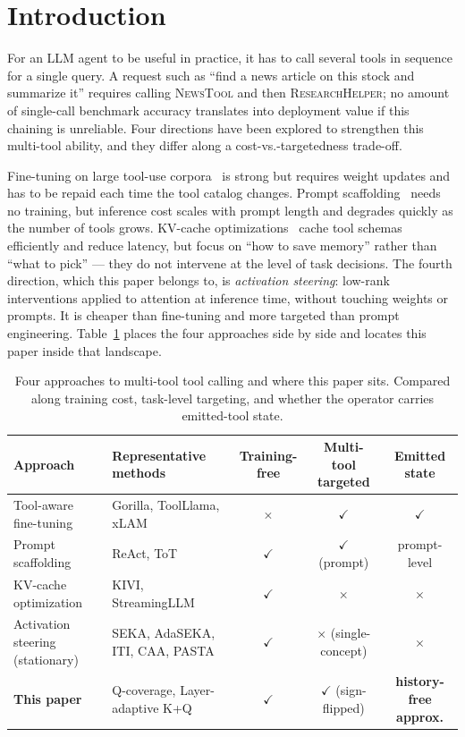 \section{Introduction}

For an LLM agent to be useful in practice, it has to call several tools in sequence for a single query. A request such as ``find a news article on this stock and summarize it'' requires calling \textsc{NewsTool} and then \textsc{ResearchHelper}; no amount of single-call benchmark accuracy translates into deployment value if this chaining is unreliable. Four directions have been explored to strengthen this multi-tool ability, and they differ along a cost-vs.-targetedness trade-off.

Fine-tuning on large tool-use corpora~\citep{patil2023gorilla,qin2024toolllm,zhang2024xlam} is strong but requires weight updates and has to be repaid each time the tool catalog changes. Prompt scaffolding~\citep{yao2023react} needs no training, but inference cost scales with prompt length and degrades quickly as the number of tools grows. KV-cache optimizations~\citep{liu2024kivi} cache tool schemas efficiently and reduce latency, but focus on ``how to save memory'' rather than ``what to pick'' --- they do not intervene at the level of task decisions. The fourth direction, which this paper belongs to, is \emph{activation steering}: low-rank interventions applied to attention at inference time, without touching weights or prompts. It is cheaper than fine-tuning and more targeted than prompt engineering. Table~\ref{tab:positioning} places the four approaches side by side and locates this paper inside that landscape.

\begin{table}[t]
\centering
\caption{Four approaches to multi-tool tool calling and where this paper sits. Compared along training cost, task-level targeting, and whether the operator carries emitted-tool state.}
\label{tab:positioning}
\small
\begin{tabularx}{\linewidth}{@{}lXccc@{}}
\toprule
Approach & Representative methods & Training-free & Multi-tool targeted & Emitted state \\
\midrule
Tool-aware fine-tuning & Gorilla, ToolLlama, xLAM & $\times$ & $\checkmark$ & $\checkmark$ \\
Prompt scaffolding & ReAct, ToT & $\checkmark$ & $\checkmark$ (prompt) & prompt-level \\
KV-cache optimization & KIVI, StreamingLLM & $\checkmark$ & $\times$ & $\times$ \\
Activation steering (stationary) & SEKA, AdaSEKA, ITI, CAA, PASTA & $\checkmark$ & $\times$ (single-concept) & $\times$ \\
\textbf{This paper} & Q-coverage, Layer-adaptive K+Q & $\boldsymbol{\checkmark}$ & $\boldsymbol{\checkmark}$ (sign-flipped) & \textbf{history-free approx.} \\
\bottomrule
\end{tabularx}
\end{table}

